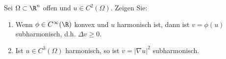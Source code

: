 
\begin{exercise}

Sei $\Omega \subset \R^n$ offen und $u \in C^2(\Omega)$.
Zeigen Sie:

\begin{enumerate}[label = (\roman*)]
    \item Wenn $\phi \in C^\infty(\R)$ konvex und $u$ harmonisch ist, dann ist $v = \phi(u)$ subharmonisch, d.h. $\Delta v \geq 0$.
    \item Ist $u \in C^3(\Omega)$ harmonisch, so ist $v = |\nabla u|^2$ subharmonisch.
\end{enumerate}

\end{exercise}



